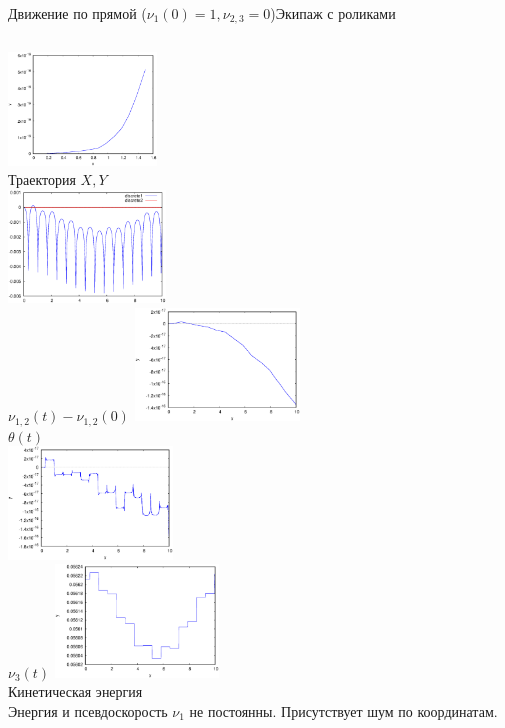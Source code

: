 \documentclass{beamer}
\begin{document}
\begin{frame}{Движение по прямой ($\nu_1(0) = 1, \nu_{2,3} = 0$)}{Экипаж с роликами}
    \begin{columns}
            \centering
            \includegraphics[width=\linewidth, height=30mm]{_sol__1_0_0__0__10__1e2_trajectory} \\
            Траектория $X, Y$ \\
            \includegraphics[width=\linewidth, height=30mm]{_sol__1_0_0__0__10__1e2_nu12_centered} \\
            $\nu_{1,2}(t) - \nu_{1,2}(0)$
            \centering
            \includegraphics[width=\linewidth, height=30mm]{_sol__1_0_0__0__10__1e2_theta} \\
            $\theta(t)$ \\
            \includegraphics[width=\linewidth, height=30mm]{_sol__1_0_0__0__10__1e2_nu3} \\
            $\nu_3(t)$
            \centering
            \includegraphics[width=\linewidth, height=30mm]{_sol__1_0_0__0__10__1e2_kin_en} \\
            Кинетическая энергия \\
            \vspace{15pt}
            Энергия и псевдоскорость $\nu_1$ не постоянны. Присутствует шум по координатам.
    \end{columns}
\end{frame}
\end{document}
